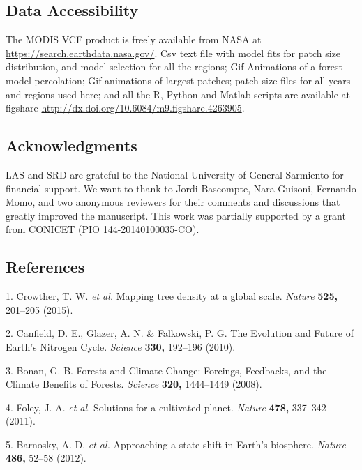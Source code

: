 \documentclass[]{article}
\begin{document}
\normalsize

\subsection{Data Accessibility}\label{data-accessibility}

The MODIS VCF product is freely available from NASA at
\url{https://search.earthdata.nasa.gov/}. Csv text file with model fits
for patch size distribution, and model selection for all the regions;
Gif Animations of a forest model percolation; Gif animations of largest
patches; patch size files for all years and regions used here; and all
the R, Python and Matlab scripts are available at figshare
\url{http://dx.doi.org/10.6084/m9.figshare.4263905}.

\subsection{Acknowledgments}\label{acknowledgments}

LAS and SRD are grateful to the National University of General Sarmiento
for financial support. We want to thank to Jordi Bascompte, Nara
Guisoni, Fernando Momo, and two anonymous reviewers for their comments
and discussions that greatly improved the manuscript. This work was
partially supported by a grant from CONICET (PIO 144-20140100035-CO).

\subsection*{References}\label{references}

\hypertarget{refs}{}
\hypertarget{ref-Crowther2015a}{}
1. Crowther, T. W. \emph{et al.} Mapping tree density at a global scale.
\emph{Nature} \textbf{525,} 201--205 (2015).

\hypertarget{ref-Canfield2010}{}
2. Canfield, D. E., Glazer, A. N. \& Falkowski, P. G. The Evolution and
Future of Earth's Nitrogen Cycle. \emph{Science} \textbf{330,} 192--196
(2010).

\hypertarget{ref-Bonan2008}{}
3. Bonan, G. B. Forests and Climate Change: Forcings, Feedbacks, and the
Climate Benefits of Forests. \emph{Science} \textbf{320,} 1444--1449
(2008).

\hypertarget{ref-Foley2011}{}
4. Foley, J. A. \emph{et al.} Solutions for a cultivated planet.
\emph{Nature} \textbf{478,} 337--342 (2011).

\hypertarget{ref-Barnosky2012}{}
5. Barnosky, A. D. \emph{et al.} Approaching a state shift in Earth's
biosphere. \emph{Nature} \textbf{486,} 52--58 (2012).
\end{document}
